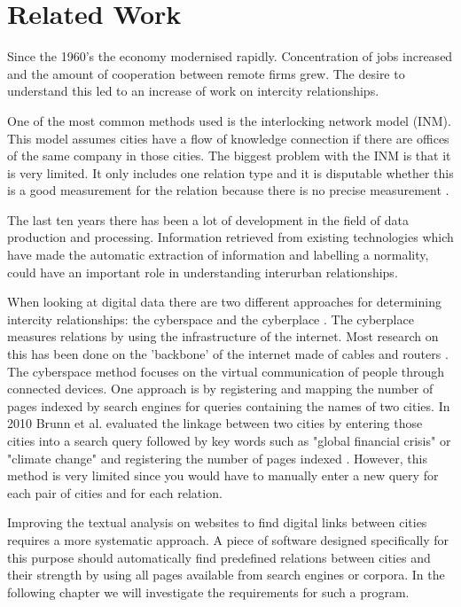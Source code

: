 \chapter{Related Work}\label{sec:related work}
Since the 1960's the economy modernised rapidly. Concentration of jobs increased and the amount of cooperation between remote firms grew. The desire to understand this led to an increase of work on intercity relationships\cite{tornqvist1968flows}.

One of the most common methods used is the interlocking network model (INM)\cite{taylor2012interlocking}. This model assumes cities have a flow of knowledge connection if there are offices of the same company in those cities. The biggest problem with the INM is that it is very limited. It only includes one relation type and it is disputable whether this is a good measurement for the relation because there is no precise measurement \cite{lambregts2008geographies}.

The last ten years there has been a lot of development in the field of data production and processing. Information retrieved from existing technologies which have made the automatic extraction of information and labelling a normality, could have an important role in understanding interurban relationships.

When looking at digital data there are two different approaches for determining intercity relationships: the cyberspace and the cyberplace \cite{devriendt2008cyberplace}. The cyberplace measures relations by using the infrastructure of the internet. Most research on this has been done on the 'backbone' of the internet made of cables and routers \cite{choi2006comparing, gorman2000networks}.
The cyberspace method focuses on the virtual communication of people through connected devices. One approach is by registering and mapping the number of pages indexed by search engines for queries containing the names of two cities\cite{devriendt2008cyberplace, janc2015visibility, janc2015geography}. In 2010 Brunn et al. evaluated the linkage between two cities by entering those cities into a search query followed by key words such as "global financial crisis" or "climate change" and registering the number of pages indexed \cite{brunn2010networks}. However, this method is very limited since you would have to manually enter a new query for each pair of cities and for each relation.

Improving the textual analysis on websites to find digital links between cities requires a more systematic approach. A piece of software designed specifically for this purpose should automatically find predefined relations between cities and their strength by using all pages available from search engines or corpora. In the following chapter we will investigate the requirements for such a program.
